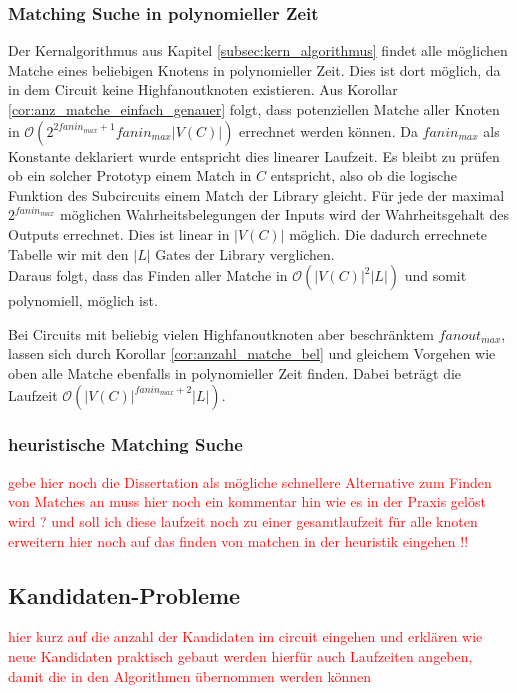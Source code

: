 \documentclass[11pt, a4paper, german]{article}
\begin{document}
\subsubsection{Matching Suche in polynomieller Zeit}
Der Kernalgorithmus aus Kapitel \ref{subsec:kern_algorithmus} findet alle möglichen Matche eines beliebigen Knotens in polynomieller Zeit. Dies ist dort möglich, da in dem Circuit keine Highfanoutknoten existieren. Aus Korollar \ref{cor:anz_matche_einfach_genauer} folgt, dass potenziellen Matche aller Knoten  in $\mathcal{O}(2^{2fanin_{max} +1}fanin_{max} |V(C)|)$ errechnet werden können. Da $fanin_{max}$ als Konstante deklariert wurde entspricht dies linearer Laufzeit. Es bleibt zu prüfen ob  ein solcher Prototyp einem Match in $C$ entspricht, also ob die logische Funktion des Subcircuits einem Match der Library gleicht. Für jede der maximal $2^{fanin_{max}}$ möglichen Wahrheitsbelegungen der Inputs wird der Wahrheitsgehalt des Outputs errechnet. Dies ist linear in $|V(C)|$ möglich. Die dadurch errechnete Tabelle wir mit den $|L|$ Gates der Library verglichen. \\
Daraus folgt, dass das Finden aller Matche in $\mathcal{O}(|V(C)|^2|L|)$ und somit polynomiell, möglich ist.

Bei Circuits mit beliebig vielen Highfanoutknoten aber beschränktem $fanout_{max}$, lassen sich durch Korollar \ref{cor:anzahl_matche_bel} und gleichem Vorgehen wie oben alle Matche ebenfalls in polynomieller Zeit finden. Dabei beträgt die Laufzeit $\mathcal{O}(|V(C)|^{fanin_{max}+2}|L|)$.

\subsubsection{heuristische Matching Suche}
 \textcolor{red}{ gebe hier noch die Dissertation als mögliche schnellere Alternative zum Finden von Matches an muss hier noch ein kommentar hin wie es in der Praxis gelöst wird ? und soll ich diese laufzeit noch zu einer gesamtlaufzeit für alle knoten erweitern}
\textcolor{red}{hier noch auf das finden von matchen in der heuristik eingehen !!}

\subsection{Kandidaten-Probleme}
\textcolor{red}{hier kurz auf die anzahl der Kandidaten im circuit eingehen und erklären wie neue Kandidaten praktisch gebaut werden hierfür auch Laufzeiten angeben, damit die in den Algorithmen übernommen werden können}
 
\end{document}
